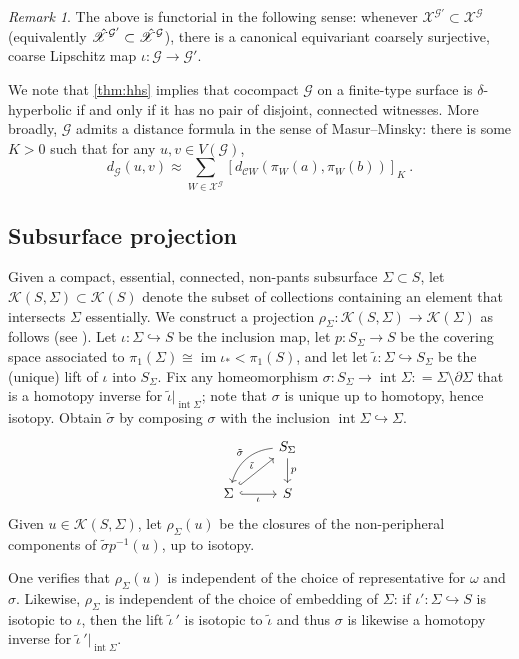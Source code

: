 \documentclass[twoside]{amsart}
\theoremstyle{plain}
\theoremstyle{break}
\theoremstyle{definition}
\theoremstyle{remark}
\newtheorem{remark*}[theorem]{Remark}
\newcommand{\dfn}{\mathrel{\mathop:}=}
\DeclareMathOperator{\img}{im}
\DeclareMathOperator{\inter}{int}
\newcommand{\G}{\mathcal G}
\newcommand{\cc}{\mathcal C}
\newcommand{\X}{\mathscr X}
\newcommand{\xc}{{\vphantom{\mathscr X}\smash{\hat{\mathscr X}}}}
\begin{document}
\begin{remark*}
  The above is functorial in the following
sense: whenever $\X^{\G'} \subset \X^\G$ (equivalently $\xc^{\G'} \subset
\xc^\G$), there is a canonical equivariant
coarsely surjective, coarse Lipschitz map $\iota: \G \to \G'$.
\end{remark*}

We note that \cref{thm:hhs} implies that cocompact $\G$ on a
finite-type surface is
$\delta$-hyperbolic if and %
only if it has no pair of disjoint, connected witnesses.  More
broadly, $\G$ admits a distance formula in the sense of
Masur--Minsky: there is some $K>0$ such that for any $u,v \in V(\G)$, 
\[
  d_\G(u,v) \approx \sum_{W \in \X^\G} [d_{\cc
  W}(\pi_W(a),\pi_W(b))]_K\:.
\]

\subsection{Subsurface projection}\label{sec:subproj}
Given a compact, essential, connected, non-pants subsurface
$\Sigma \subset S$, let $\mathcal{K}(S,\Sigma) \subset
\mathcal{K}(S)$ denote the
subset of collections containing an element that intersects $\Sigma$ essentially.
We construct a 
projection $\rho_\Sigma : \mathcal{K}(S,\Sigma) 
\to {\mathcal{K}(\Sigma)}$ as follows (see 
\cite[\S5.2]{curvenotes}). 
Let $\iota : \Sigma \hookrightarrow S$ be the inclusion map, 
let $p : S_\Sigma \to S$ be the 
covering space associated to $\pi_1(\Sigma) \cong \img \iota_* <
\pi_1(S)$, and let
let $\tilde \iota : \Sigma \hookrightarrow
S_\Sigma$ be the (unique) lift of $\iota$
into $S_\Sigma$.  Fix any homeomorphism $\sigma :
S_\Sigma \to \inter \Sigma \dfn \Sigma \setminus \partial
\Sigma$ that is a homotopy inverse for
$\tilde \iota|_{\inter \Sigma}$; %
note that $\sigma$ is unique up to homotopy, hence isotopy. Obtain 
$\tilde \sigma$ by composing $\sigma$ with the inclusion $\inter
\Sigma \hookrightarrow \Sigma$.
\[
\begin{tikzcd}
  & S_\Sigma \ar[d,"p"] 
  \ar[dl, bend right=35,"\tilde \sigma"'] \\ 
  \Sigma \rar[hook,"\iota"'] \ar[ur,hook,"\tilde \iota"] & S 
\end{tikzcd}
\]
Given $u \in \mathcal{K}(S,\Sigma)$,
let $\rho_\Sigma(u)$ 
be the closures of the 
non-peripheral components of $\tilde \sigma p^{-1}(u)$, up to
isotopy.  

One verifies that $\rho_\Sigma(u)$ 
is independent of the 
choice of representative for $\omega$ and $\sigma$.
  Likewise, $\rho_\Sigma$ is independent of the choice of embedding
  of $\Sigma$: if $\iota' : \Sigma \hookrightarrow
S$ is
isotopic to $\iota$, then the lift $\tilde\iota\,'$ is
isotopic to $\tilde \iota$ and thus $\sigma$ is likewise a homotopy
inverse for $\tilde \iota\,'|_{\inter \Sigma}$.
\end{document}
